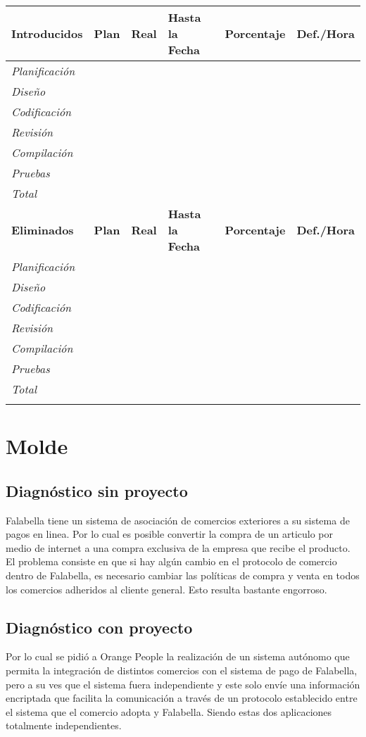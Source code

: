 \documentclass[a4paper,12pt,openany,oneside]{book}
\begin{document}
\newpage
\begin{tabular}{| l | l | l | l | l | l |}
\hline
\textbf{Introducidos} & \textbf{Plan} & \textbf{Real} & \textbf{Hasta la Fecha} & \textbf{Porcentaje} & \textbf{Def./Hora} \\
\hline
\textit{Planificación} & & & & & \\
\hline
\textit{Diseño} & & & & & \\
\hline
\textit{Codificación} & & & & & \\
\hline
\textit{Revisión} & & & & & \\
\hline
\textit{Compilación} & & & & & \\
\hline
\textit{Pruebas} & & & & & \\
\hline
\textit{Total} & & & & & \\
\hline
\textbf{Eliminados} & \textbf{Plan} & \textbf{Real} & \textbf{Hasta la Fecha} & \textbf{Porcentaje} & \textbf{Def./Hora} \\
\hline
\textit{Planificación} & & & & & \\
\hline
\textit{Diseño} & & & & & \\
\hline
\textit{Codificación} & & & & & \\
\hline
\textit{Revisión} & & & & & \\
\hline
\textit{Compilación} & & & & & \\
\hline
\textit{Pruebas} & & & & & \\
\hline
\textit{Total} & & & & & \\
\hline
 & & & & & \\
\hline
\end{tabular}
\chapter{Molde}
\thispagestyle{empty}
\section{Diagnóstico sin proyecto}
Falabella tiene un sistema de asociación de comercios exteriores a su sistema de pagos en linea. Por lo cual es posible convertir la compra de un articulo por medio de internet a una compra exclusiva de la empresa que recibe el producto. El problema consiste en que si hay algún cambio en el protocolo de comercio dentro de Falabella, es necesario cambiar las políticas de compra y venta en todos los comercios adheridos al cliente general. Esto resulta bastante engorroso. 
\section{Diagnóstico con proyecto}
Por lo cual se pidió a Orange People la realización de un sistema autónomo que permita la integración de distintos comercios con el sistema de pago de Falabella, pero a su ves que el sistema fuera independiente y este solo envíe una información encriptada que facilita la comunicación a través de un protocolo establecido entre el sistema que el comercio adopta y Falabella. Siendo estas dos aplicaciones totalmente independientes.
\end{document}
